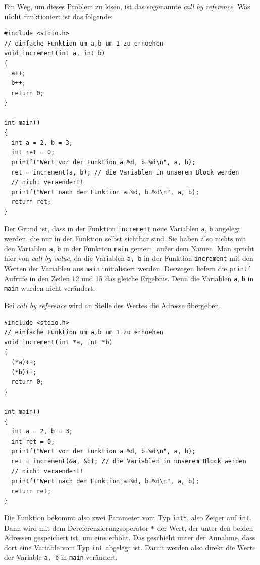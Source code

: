 Ein Weg, um dieses Problem zu lösen, ist das sogenannte \emph{call by reference}.
Was \textbf{nicht} funktioniert ist das folgende:
\begin{lstlisting}
#include <stdio.h>
// einfache Funktion um a,b um 1 zu erhoehen
void increment(int a, int b)
{
  a++;
  b++;
  return 0;
}

int main()
{
  int a = 2, b = 3;
  int ret = 0;
  printf("Wert vor der Funktion a=%d, b=%d\n", a, b);
  ret = increment(a, b); // die Variablen in unserem Block werden
  // nicht veraendert!
  printf("Wert nach der Funktion a=%d, b=%d\n", a, b);
  return ret;
}
\end{lstlisting}
Der Grund ist, dass in der Funktion \verb|increment| neue Variablen \verb|a|, \verb|b| angelegt werden, die nur in der Funktion selbst sichtbar sind.
Sie haben also nichts mit den Variablen \verb|a|, \verb|b| in der Funktion \verb|main| gemein, außer dem Namen.
Man spricht hier von \emph{call by value}, da die Variablen \verb|a, b| in der Funktion \verb|increment| mit den Werten der Variablen aus \verb|main| initialisiert werden.
Deswegen liefern die \verb|printf| Aufrufe in den Zeilen 12 und 15 das gleiche Ergebnis.
Denn die Variablen \verb|a|, \verb|b| in \verb|main| wurden nicht verändert.

Bei \emph{call by reference} wird an Stelle des Wertes die Adresse übergeben.
\begin{lstlisting}
#include <stdio.h>
// einfache Funktion um a,b um 1 zu erhoehen
void increment(int *a, int *b)
{
  (*a)++;
  (*b)++;
  return 0;
}

int main()
{
  int a = 2, b = 3;
  int ret = 0;
  printf("Wert vor der Funktion a=%d, b=%d\n", a, b);
  ret = increment(&a, &b); // die Variablen in unserem Block werden
  // nicht veraendert!
  printf("Wert nach der Funktion a=%d, b=%d\n", a, b);
  return ret;
}
\end{lstlisting}
Die Funktion bekommt also zwei Parameter vom Typ \verb|int*|, also Zeiger auf \verb|int|.
Dann wird mit dem Dereferenzierungsoperator \verb|*| der Wert, der unter den beiden Adressen gespeichert ist, um eins erhöht.
Das geschieht unter der Annahme, dass dort eine Variable vom Typ \verb|int| abgelegt ist.
Damit werden also direkt die Werte der Variable \verb|a, b| in \verb|main| verändert.

